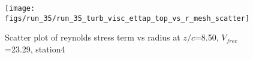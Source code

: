 \begin{figure}[H]
\centering
\texttt{[image: figs/run\_35/run\_35\_turb\_visc\_ettap\_top\_vs\_r\_mesh\_scatter]}
\caption{Scatter plot of reynolds stress term vs radius at $z/c$=8.50, $V_{free}$=23.29, station4}
\label{fig:run_35_turb_visc_ettap_top_vs_r_mesh_scatter}
\end{figure}


